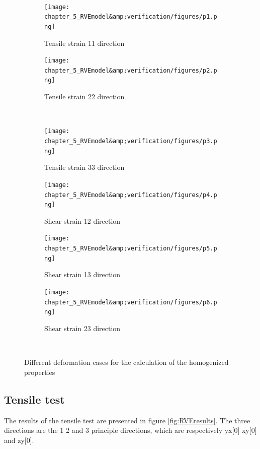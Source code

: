 \\
\begin{figure}
\centering
  \begin{subfigure}[b]{0.40\textwidth}
    \texttt{[image: chapter\_5\_RVEmodel\&amp;verification/figures/p1.png]}
    \caption{Tensile strain 11 direction}
    \label{fig:1}
  \end{subfigure}
  \begin{subfigure}[b]{0.40\textwidth}
    \texttt{[image: chapter\_5\_RVEmodel\&amp;verification/figures/p2.png]}
    \caption{Tensile strain 22 direction}
    \label{fig:2}
  \end{subfigure}
  \\
    \begin{subfigure}[b]{0.40\textwidth}
    \texttt{[image: chapter\_5\_RVEmodel\&amp;verification/figures/p3.png]}
    \caption{Tensile strain 33 direction}
    \label{fig:3}
  \end{subfigure}
  \begin{subfigure}[b]{0.40\textwidth}
    \texttt{[image: chapter\_5\_RVEmodel\&amp;verification/figures/p4.png]}
    \caption{Shear strain 12 direction}
    \label{fig:4}
  \end{subfigure}
  
  \begin{subfigure}[b]{0.40\textwidth}
    \texttt{[image: chapter\_5\_RVEmodel\&amp;verification/figures/p5.png]}
    \caption{Shear strain 13 direction}
    \label{fig:1}
  \end{subfigure}
  \begin{subfigure}[b]{0.40\textwidth}
    \texttt{[image: chapter\_5\_RVEmodel\&amp;verification/figures/p6.png]}
    \caption{Shear strain 23 direction}
    \label{fig:2}
  \end{subfigure}
  \\

  
  \caption{Different deformation cases for the calculation of the homogenized properties}
    \label{fig:deformations}
\end{figure}

 \pagebreak[4]




\subsection{Tensile test}
The results of the tensile test are presented in figure \ref{fig:RVEresults}. The three directions are the 1 2 and 3 principle directions, which are respectively yx[0] xy[0] and zy[0].

